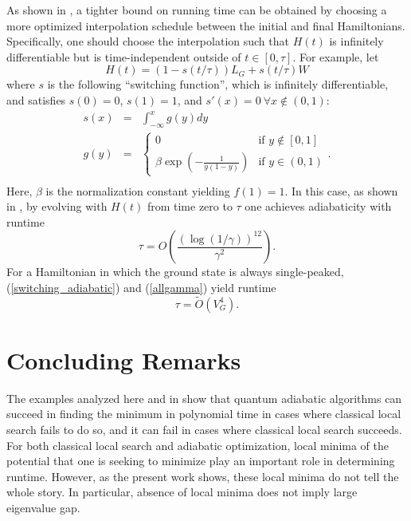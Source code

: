 As shown in \cite{Elgart_Hagedorn}, a tighter bound on running time
can be obtained by choosing a more optimized interpolation schedule
between the initial and final Hamiltonians. Specifically, one should
choose the interpolation such that $H(t)$ is infinitely differentiable
but is time-independent outside of $t \in [0,\tau]$. For example,
let
\begin{equation}
H(t) = (1-s(t/\tau)) L_G + s(t/\tau) W
\end{equation}
where $s$ is the following ``switching function'', which is infinitely
differentiable, and satisfies $s(0) = 0$, $s(1) = 1$, and
$s'(x) = 0 \  \forall x \notin (0,1)$:
\begin{eqnarray}
s(x) & = & \int_{-\infty}^x g(y) dy \\
g(y) & = & \left\{ \begin{array}{ll}
0 & \textrm{if $y \notin [0,1]$} \\
\beta \exp \left( - \frac{1}{y(1-y)} \right) & \textrm{if $y \in (0,1)$}
\end{array} \right. . \\
\end{eqnarray}
Here, $\beta$ is the normalization constant yielding $f(1) = 1$.
In this case, as shown in \cite{Elgart_Hagedorn}, by evolving with
$H(t)$ from time zero to $\tau$ one achieves adiabaticity with
runtime
\begin{equation}
\label{switching_adiabatic}
\tau = O\left( \frac{(\log(1/\gamma))^{12}}{\gamma^2} \right).
\end{equation}
For a Hamiltonian in which the ground state is always single-peaked,
(\ref{switching_adiabatic}) and (\ref{allgamma}) yield runtime
\begin{equation}
\label{fast}
\tau = \widetilde{O}(V_G^4).
\end{equation}

\section{Concluding Remarks}

The examples analyzed here and in \cite{R04, DMV01, FGG02, VDV03,
  aminchoi} show that quantum adiabatic algorithms can succeed in
finding the minimum in polynomial time in cases where classical local
search fails to do so, and it can fail in cases where classical local
search succeeds. For both classical local search and adiabatic
optimization, local minima of the potential that one is seeking to
minimize play an important role in determining runtime. However, as
the present work shows, these local minima do not tell the whole
story. In particular, absence of local minima does not imply large
eigenvalue gap.

